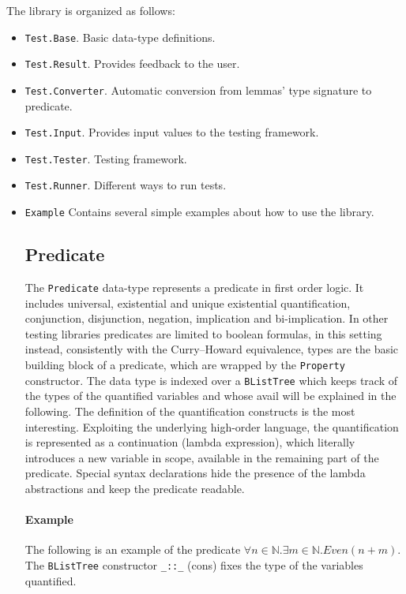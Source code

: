 \documentclass[10pt,a4paper]{article}
\begin{document}
The library is organized as follows:
\begin{itemize}
	\item \texttt{Test.Base}. Basic data-type definitions.
	\item \texttt{Test.Result}. Provides feedback to the user.
	\item \texttt{Test.Converter}. Automatic conversion from lemmas' type signature to predicate.
	\item \texttt{Test.Input}. Provides input values to the testing framework.
	\item \texttt{Test.Tester}. Testing framework.
	\item \texttt{Test.Runner}. Different ways to run tests.
	\item \texttt{Example} Contains several simple examples about how to use the library.
	
\subsection{Predicate}
The \texttt{Predicate} data-type represents a predicate in first order logic.
It includes universal, existential and unique existential quantification, conjunction, disjunction, negation, implication and bi-implication.
In other testing libraries predicates are limited to boolean formulas, in this setting instead, consistently with the Curry–Howard equivalence, types are the basic building block of a predicate, which are wrapped by the \texttt{Property} constructor.
The data type is indexed over a \texttt{BListTree} which keeps track of the types of the quantified variables and whose avail will be explained in the following.
The definition of the quantification constructs is the most interesting.
Exploiting the underlying high-order language, the quantification is represented as a continuation (lambda expression), which literally introduces a new variable in scope, available in the remaining part of the predicate.
Special syntax declarations hide the presence of the lambda abstractions and keep the predicate readable.

\paragraph{Example}
The following is an example of the predicate $\forall n \in \mathbb{N} . \exists m \in \mathbb{N} . Even (n + m)$. The \texttt{BListTree} constructor \texttt{\_::\_} (cons) fixes the type of the variables quantified.  


\end{itemize}
\end{document}
